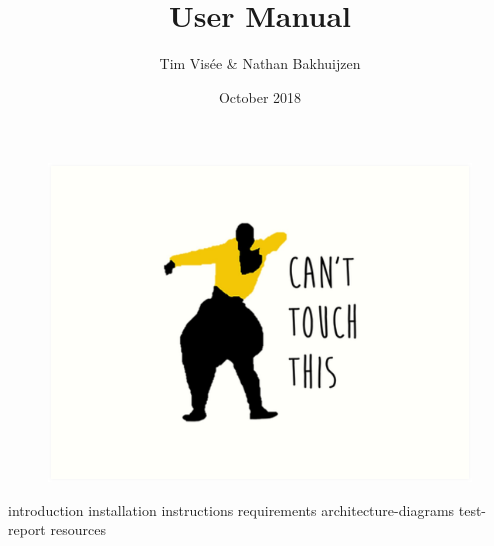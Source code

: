 \documentclass[a4paper]{article}
\title{User Manual}
\author{Tim Visée \& Nathan Bakhuijzen}
\date{October 2018}
\begin{document}
  \maketitle
  \begin{figure}[h]
    \centering
    \includegraphics[width=\linewidth]{cant-touch-this}
  \end{figure}
  \clearpage

  \setcounter{page}{2}

  {introduction}
  {installation}
  {instructions}
  {requirements}
  {architecture-diagrams}
  {test-report}
  {resources}
\end{document}
